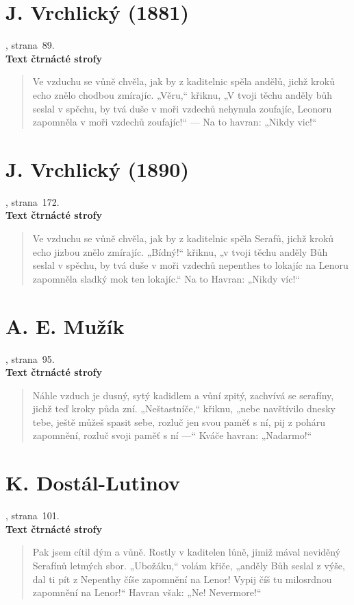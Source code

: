 \documentclass[dp.tex]{subfiles}
\begin{document}
\section*{J. Vrchlický (1881)}
, strana~89.
\\\textbf{Text čtrnácté strofy}
\begin{verse}
 Ve vzduchu se vůně chvěla, jak by z kaditelnic spěla
 andělů, jichž kroků echo znělo chodbou zmírajíc.
 „Věru,“ křiknu, „V tvoji těchu anděly bůh seslal v spěchu,
 by tvá duše v moři vzdechů nehynula zoufajíc,
 Leonoru zapomněla v moři vzdechů zoufajíc!“ —
        Na to havran: „Nikdy vic!“
\end{verse}

\section*{J. Vrchlický (1890)}
, strana~172.
\\\textbf{Text čtrnácté strofy}
\begin{verse}
 Ve vzduchu se vůně chvěla,
 jak by z kaditelnic spěla
 Serafů, jichž kroků echo
 jizbou znělo zmírajíc.
 „Bídný!“ křiknu, „v tvoji těchu
 anděly Bůh seslal v spěchu,
 by tvá duše v moři vzdechů
 nepenthes to lokajíc
 na Lenoru zapomněla
 sladký mok ten lokajíc.“
        Na to Havran: „Nikdy víc!“
\end{verse}

\section*{A. E. Mužík}
, strana~95.
\\\textbf{Text čtrnácté strofy}
\begin{verse}
 Náhle vzduch je dusný, sytý
 kadidlem a vůní zpitý,
 zachvívá se serafíny,
 jichž teď kroky půda zní.
 „Neštastníče,“ křiknu, „nebe
 navštívilo dnesky tebe,
 ještě můžeš spasit sebe,
 rozluč jen svou paměť s ní,
 pij z poháru zapomnění,
 rozluč svoji paměť s ní —“
 Kváče havran: „Nadarmo!“
\end{verse}

\section*{K. Dostál-Lutinov}
, strana~101.
\\\textbf{Text čtrnácté strofy}
\begin{verse}
 Pak jsem cítil dým a vůně. Rostly v kaditelen lůně,
 jimiž mával neviděný Serafínů letmých sbor.
 „Ubožáku,“ volám křiče, „anděly Bůh seslal z výše,
 dal ti pít z Nepenthy číše zapomnění na Lenor!
 Vypij číš tu milosrdnou zapomnění na Lenor!“
        Havran však: „Ne! Nevermore!“
\end{verse}
\end{document}
